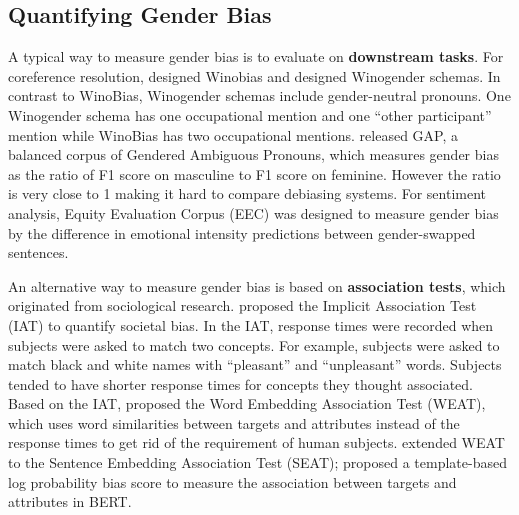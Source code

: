 \subsection{Quantifying Gender Bias}
A typical way to measure gender bias is to evaluate on
\textbf{downstream tasks}. For coreference resolution,
\citet{zhao2018gender} designed Winobias and
\citet{rudinger2018gender} designed Winogender schemas. In
contrast to WinoBias, Winogender schemas include
gender-neutral pronouns. One Winogender schema has one
occupational mention and one ``other participant'' mention
while WinoBias has two occupational mentions. \citet{webster2018mind} released GAP, a
balanced corpus of Gendered Ambiguous Pronouns, which
measures gender bias as the ratio of F1 score on masculine
to F1 score on feminine. However the ratio is very close to 1 \citep{Chada_2019, Attree_2019} making it hard to compare debiasing systems. For sentiment analysis, Equity Evaluation Corpus (EEC) \citep{Kiritchenko_2018} was designed to measure gender bias by the difference in emotional intensity predictions between gender-swapped sentences.

An alternative way to measure gender bias is based on \textbf{association tests}, which originated from sociological research. \citet{greenwald1998measuring} proposed the Implicit Association Test (IAT) to quantify societal bias. In the IAT, response times were recorded when subjects were asked to match two concepts. For example, subjects were asked to match black and white names with ``pleasant'' and ``unpleasant'' words. Subjects tended to have shorter response times for concepts they thought associated. Based on the IAT, \citet{caliskan2017semantics} proposed the Word Embedding Association Test (WEAT), which uses word similarities between targets and attributes instead of the response times to get rid of the requirement of human subjects. \citet{may2019measuring} extended WEAT to the Sentence Embedding Association Test (SEAT); \citet{kurita2019measuring} proposed a template-based log probability bias score to measure the association between targets and attributes in BERT.


